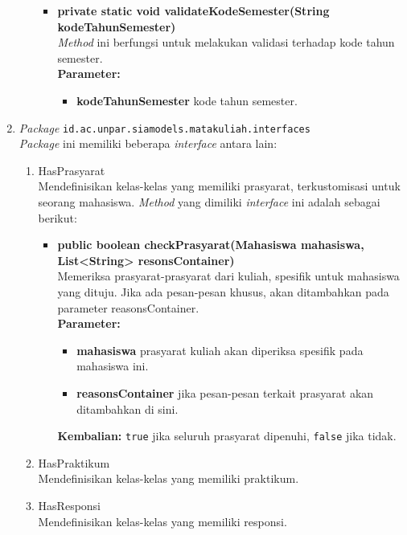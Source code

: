 \begin{enumerate}
\begin{enumerate}
\begin{itemize}
			\item \textbf{private static void validateKodeSemester(String kodeTahunSemester)} \\
			\textit{Method} ini berfungsi untuk melakukan  validasi terhadap kode tahun semester. \\
			\textbf{Parameter:}
			\begin{itemize}
				\item \textbf{kodeTahunSemester} kode tahun semester.
			\end{itemize}
		\end{itemize}
	\end{enumerate}
	\item \textit{Package} \texttt{id.ac.unpar.siamodels.matakuliah.interfaces}\\
	\textit{Package} ini memiliki beberapa \textit{interface} antara lain:
	\begin{enumerate}
		\item HasPrasyarat\\
		Mendefinisikan kelas-kelas yang memiliki prasyarat, terkustomisasi untuk seorang mahasiswa. \textit{Method} yang dimiliki \textit{interface} ini adalah sebagai berikut:
		\begin{itemize}
			\item \textbf{public boolean checkPrasyarat(Mahasiswa mahasiswa, List<String> resonsContainer)}\\
			Memeriksa prasyarat-prasyarat dari kuliah, spesifik untuk mahasiswa yang dituju. Jika ada pesan-pesan khusus, akan ditambahkan pada parameter reasonsContainer.\\
			\textbf{Parameter:}
			\begin{itemize}
				\item \textbf{mahasiswa} prasyarat kuliah akan diperiksa spesifik pada mahasiswa ini.
				\item \textbf{reasonsContainer} jika pesan-pesan terkait prasyarat akan ditambahkan di sini.
			\end{itemize}
			\textbf{Kembalian:} \texttt{true} jika seluruh prasyarat dipenuhi, \texttt{false} jika tidak.
		\end{itemize}
		
		\item HasPraktikum\\
		Mendefinisikan kelas-kelas yang memiliki praktikum.
		\item HasResponsi\\
		Mendefinisikan kelas-kelas yang memiliki responsi.
	\end{enumerate}
	

\end{enumerate}
